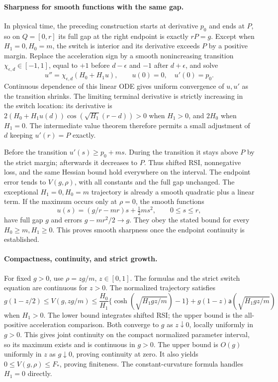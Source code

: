 \paragraph{Sharpness for smooth functions with the same gap.}
In physical time, the preceding construction starts at derivative
$p_0$ and ends at $P$, so on $Q=[0,r]$ its full gap at the right
endpoint is exactly $rP=g$.  Except when $H_1=0,H_0=m$, the switch is
interior and its derivative exceeds $P$ by a positive margin.
Replace the acceleration sign by a smooth nonincreasing transition
$\chi_{\epsilon,d}\in[-1,1]$, equal to $+1$ before $d-\epsilon$ and
$-1$ after $d+\epsilon$, and solve
\[
 u''=\chi_{\epsilon,d}(H_0+H_1u),\qquad u(0)=0,\quad u'(0)=p_0.
\]
Continuous dependence of this linear ODE gives uniform convergence of
$u,u'$ as the transition shrinks.  The limiting terminal derivative is
strictly increasing in the switch location: its derivative is
$2(H_0+H_1u(d))\cos(\sqrt{H_1}(r-d))>0$ when $H_1>0$, and $2H_0$
when $H_1=0$.  The intermediate value theorem therefore permits a
small adjustment of $d$ keeping $u'(r)=P$ exactly.

Before the transition $u'(s)\ge p_0+ms$.  During the transition it
stays above $P$ by the strict margin; afterwards it decreases to $P$.
Thus shifted RSI, nonnegative loss, and the same Hessian bound hold
everywhere on the interval.  The endpoint error tends to $V(g,\rho)$,
with all constants and the full gap unchanged.  The exceptional
$H_1=0,H_0=m$ trajectory is already a smooth quadratic plus a linear
term.  If the maximum occurs only at $\rho=0$, the smooth functions
\[
 u(s)=(g/r-mr)s+\tfrac12ms^2,\qquad 0\le s\le r,
\]
have full gap $g$ and errors $g-mr^2/2\to g$.  They obey the stated
bound for every $H_0\ge m,H_1\ge0$.  This proves smooth sharpness once
the endpoint continuity is established.

\paragraph{Compactness, continuity, and strict growth.}
For fixed $g>0$, use $\rho=zg/m$, $z\in[0,1]$.  The formulas and the
strict switch equation are continuous for $z>0$.  The normalized
trajectory satisfies
\[
 g(1-z/2)\le V(g,zg/m)
 \le\frac{H_0}{H_1}\{\cosh(\sqrt{H_1gz/m})-1\}
       +g(1-z)\mathsf a(\sqrt{H_1gz/m})
\]
when $H_1>0$.  The lower bound integrates shifted RSI; the upper bound
is the all-positive acceleration comparison.  Both converge to $g$
as $z\downarrow0$, locally uniformly in $g>0$.  This gives joint
continuity on the compact normalized parameter interval, so its maximum
exists and is continuous in $g>0$.  The upper bound is $O(g)$ uniformly
in $z$ as $g\downarrow0$, proving continuity at zero.  It also yields
$0\le V(g,\rho)\le F_*$, proving finiteness.  The constant-curvature
formula handles $H_1=0$ directly.

